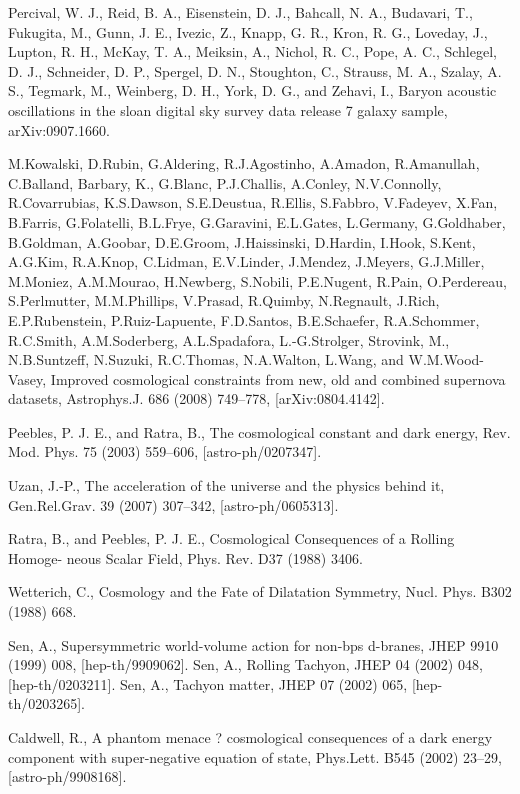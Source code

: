 \documentclass[a4paper,12pt]{report}
\theoremstyle{plain}
\theoremstyle{plain}
\begin{document}
\begin{thebibliography}{90}
 Percival, W. J., Reid, B. A., Eisenstein, D. J., Bahcall, N. A., Budavari, T., Fukugita,
M., Gunn, J. E., Ivezic, Z., Knapp, G. R., Kron, R. G., Loveday, J., Lupton, R. H.,
McKay, T. A., Meiksin, A., Nichol, R. C., Pope, A. C., Schlegel, D. J., Schneider,
D. P., Spergel, D. N., Stoughton, C., Strauss, M. A., Szalay, A. S., Tegmark, M.,
Weinberg, D. H., York, D. G., and Zehavi, I., Baryon acoustic oscillations in the
sloan digital sky survey data release 7 galaxy sample, arXiv:0907.1660.

 M.Kowalski, D.Rubin, G.Aldering, R.J.Agostinho, A.Amadon, R.Amanullah,
C.Balland, Barbary, K., G.Blanc, P.J.Challis, A.Conley, N.V.Connolly,
R.Covarrubias, K.S.Dawson, S.E.Deustua, R.Ellis, S.Fabbro, V.Fadeyev,
X.Fan, B.Farris, G.Folatelli, B.L.Frye, G.Garavini, E.L.Gates, L.Germany,
G.Goldhaber, B.Goldman, A.Goobar, D.E.Groom, J.Haissinski, D.Hardin,
I.Hook, S.Kent, A.G.Kim, R.A.Knop, C.Lidman, E.V.Linder, J.Mendez, J.Meyers,
G.J.Miller, M.Moniez, A.M.Mourao, H.Newberg, S.Nobili, P.E.Nugent, R.Pain,
O.Perdereau, S.Perlmutter, M.M.Phillips, V.Prasad, R.Quimby, N.Regnault, J.Rich,
E.P.Rubenstein, P.Ruiz-Lapuente, F.D.Santos, B.E.Schaefer, R.A.Schommer,
R.C.Smith, A.M.Soderberg, A.L.Spadafora, L.-G.Strolger, Strovink, M.,
N.B.Suntzeff, N.Suzuki, R.C.Thomas, N.A.Walton, L.Wang, and W.M.Wood-
Vasey, Improved cosmological constraints from new, old and combined supernova
datasets, Astrophys.J. 686 (2008) 749–778, [arXiv:0804.4142].

 Peebles, P. J. E., and Ratra, B., The cosmological constant and dark energy, Rev.
Mod. Phys. 75 (2003) 559–606, [astro-ph/0207347].

 Uzan, J.-P., The acceleration of the universe and the physics behind it, Gen.Rel.Grav.
39 (2007) 307–342, [astro-ph/0605313].

 Ratra, B., and Peebles, P. J. E., Cosmological Consequences of a Rolling Homoge-
neous Scalar Field, Phys. Rev. D37 (1988) 3406.

 Wetterich, C., Cosmology and the Fate of Dilatation Symmetry, Nucl. Phys. B302
(1988) 668.

 Sen, A., Supersymmetric world-volume action for non-bps d-branes, JHEP 9910
(1999) 008, [hep-th/9909062].
 Sen, A., Rolling Tachyon, JHEP 04 (2002) 048, [hep-th/0203211].
 Sen, A., Tachyon matter, JHEP 07 (2002) 065, [hep-th/0203265].

 Caldwell, R., A phantom menace ? cosmological consequences of a dark energy
component with super-negative equation of state, Phys.Lett. B545 (2002) 23–29,
[astro-ph/9908168].


\end{thebibliography}
\end{document}
